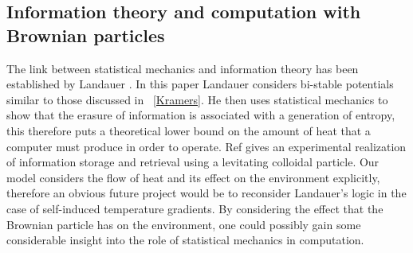 \subsection{Information theory and computation with Brownian particles}
The link between statistical mechanics and information theory has been established by Landauer \cite{Landauer1961}. In this paper Landauer considers bi-stable potentials similar to those discussed in ~\autoref{Kramers}. He then uses statistical mechanics to show that the erasure of information is associated with a generation of entropy, this therefore puts a theoretical lower bound on the amount of heat that a computer must produce in order to operate. Ref \cite{MyersCelebranoKrishnan2015} gives an experimental realization of information storage and retrieval using a levitating colloidal particle. Our model considers the flow of heat and its effect on the environment explicitly, therefore an obvious future project would be to reconsider Landauer's logic in the case of self-induced temperature gradients. By considering the effect that the Brownian particle has on the environment, one could possibly gain some considerable insight into the role of statistical mechanics in computation.

%
